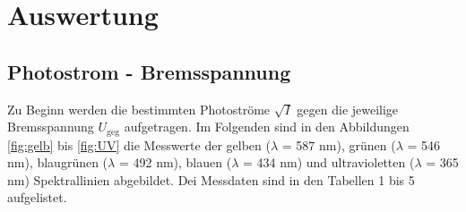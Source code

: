 \section{Auswertung}
\label{sec:Auswertung}
\subsection{Photostrom - Bremsspannung}
\label{subsec:a}

Zu Beginn werden die bestimmten Photoströme $\sqrt{I}$ gegen die jeweilige Bremsspannung $U_\text{geg}$ aufgetragen. Im Folgenden sind in den Abbildungen \ref{fig:gelb} bis \ref{fig:UV} die Messwerte der gelben ($\lambda$ = 587 nm), grünen ($\lambda$ = 546 nm), blaugrünen ($\lambda$ = 492 nm), blauen ($\lambda$ = 434 nm) und ultravioletten ($\lambda$ = 365 nm) Spektrallinien abgebildet. Dei Messdaten sind in den Tabellen 1 bis 5 aufgelistet.

